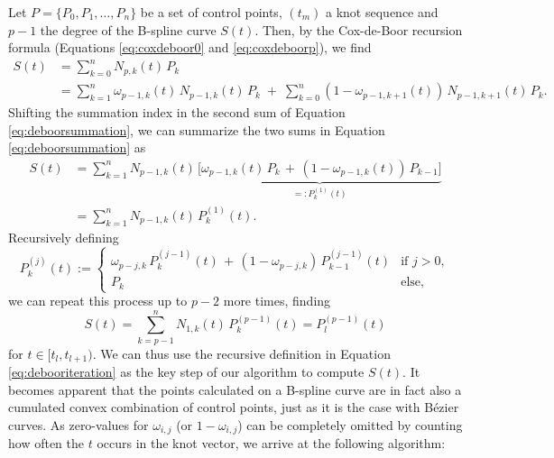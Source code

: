 \documentclass[a4paper, 11pt]{report}
\theoremstyle{definition}
\begin{document}
	Let $P = \{P_0, P_1, \ldots, P_n\}$ be a set of control points, $(t_m)$ a knot sequence and $p-1$ the degree of the B-spline curve $S(t)$. Then, by the Cox-de-Boor recursion formula (Equations \ref{eq:coxdeboor0} and \ref{eq:coxdeboorp}), we find
	\begin{align}\label{eq:deboorsummation}
		S(t) 	&= \sum_{k=0}^n N_{p,k}(t) \, P_k \nonumber \\
				&= \sum_{k=1}^n \omega_{p-1,k}(t) \, N_{p-1, k}(t) \, P_k  \; + \; \sum_{k=0}^n \left( 1-\omega_{p-1,k+1}(t) \right) \, N_{p-1, k+1}(t) \, P_k.
	\end{align}
	Shifting the summation index in the second sum of Equation \ref{eq:deboorsummation}, we can summarize the two sums in Equation \ref{eq:deboorsummation} as
	\begin{align*} 
		S(t) 	&= \sum_{k=1}^n N_{p-1, k}(t) \, \underbrace{\Big[ \omega_{p-1,k}(t) \, P_k  \, + \, \left( 1-\omega_{p-1,k}(t) \right) \, P_{k-1} \Big]}_{=: P_k^{(1)}(t)} \\
				&= \sum_{k=1}^n N_{p-1, k}(t) \, P_k^{(1)}(t).
	\end{align*}
	Recursively defining
	\begin{equation}\label{eq:debooriteration}
		P^{(j)}_k(t) := \begin{cases}
			\omega_{p-j, k} \, P^{(j-1)}_k(t) \, + \, (1-\omega_{p-j, k}) \, P^{(j-1)}_{k-1}(t) 	&\text{if } j > 0,\\
			P_k 																					&\text{else},
		\end{cases}
	\end{equation}
	we can repeat this process up to $p-2$ more times, finding
	$$ S(t) = \sum_{k=p-1}^n N_{1, k}(t) \, P^{(p-1)}_k(t) = P^{(p-1)}_l(t)$$
	for $t \in [t_l, t_{l+1})$. We can thus use the recursive definition in Equation \ref{eq:debooriteration} as the key step of our algorithm to compute $S(t)$. It becomes apparent that the points calculated on a B-spline curve are in fact also a cumulated convex combination of control points, just as it is the case with Bézier curves. As zero-values for $\omega_{i,j}$ (or $1-\omega_{i,j}$) can be completely omitted by counting how often the $t$ occurs in the knot vector, we arrive at the following algorithm:
\end{document}
